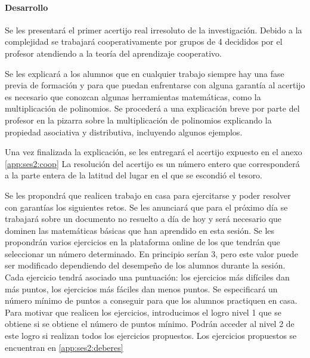 \paragraph{Desarrollo}

Se les presentará el primer acertijo real irresoluto de la investigación.
%
Debido a la complejidad se trabajará cooperativamente por grupos de 4 decididos por el profesor atendiendo a la teoría del aprendizaje cooperativo. 

Se les explicará a los alumnos que en cualquier trabajo siempre hay una fase previa de formación y para que puedan enfrentarse con alguna garantía al acertijo es necesario que conozcan algunas herramientas matemáticas, como la multiplicación de polinomios.
%
Se procederá a una explicación breve por parte del profesor en la pizarra sobre la multiplicación de polinomios explicando la propiedad asociativa y distributiva, incluyendo algunos ejemplos.

Una vez finalizada la explicación, se les entregará el acertijo expuesto en el anexo \ref{app:ses2:coop}
%
La resolución del acertijo es un número entero que corresponderá a la parte entera de la latitud del lugar en el que se escondió el tesoro.



Se les propondrá que realicen trabajo en casa para ejercitarse y poder resolver con garantías los siguientes retos.
%
Se les anunciará que para el próximo día se trabajará sobre un documento no resuelto a día de hoy y será necesario que dominen las matemáticas básicas que han aprendido en esta sesión.
%
Se les propondrán varios ejercicios en la plataforma online de los que tendrán que seleccionar un número determinado. 
%
En principio serían 3, pero este valor puede ser modificado dependiendo del desempeño de los alumnos durante la sesión.
%
Cada ejercicio tendrá asociado una puntuación: los ejercicios más difíciles dan más puntos, los ejercicios más fáciles dan menos puntos.
%
Se especificará un número mínimo de puntos a conseguir para que los alumnos practiquen en casa. 
%
Para motivar que realicen los ejercicios, introducimos el logro  nivel 1 que se obtiene si se obtiene el número de puntos mínimo.
%
Podrán acceder al nivel 2 de este logro si realizan todos los ejercicios propuestos.
%
Los ejercicios propuestos se encuentran en \ref{app:ses2:deberes}

